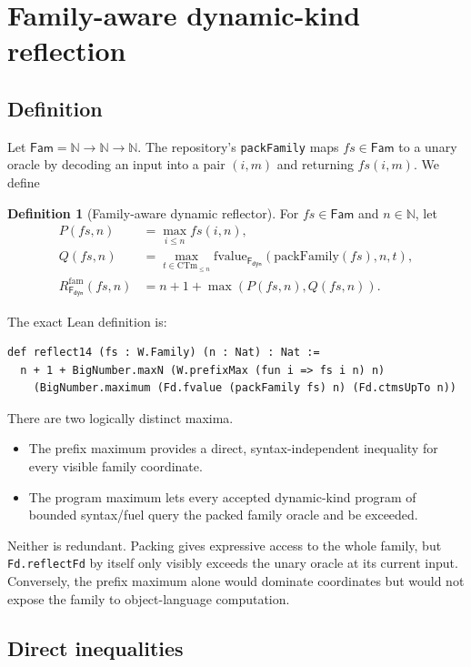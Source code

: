 \documentclass[11pt]{article}
\theoremstyle{definition}
\newtheorem{definition}[theorem]{Definition}
\theoremstyle{remark}
\newcommand{\N}{\mathbb{N}}
\newcommand{\lean}[1]{\texttt{#1}}
\newcommand{\Fam}{\mathsf{Fam}}
\newcommand{\Fd}{\mathsf{F}_{\mathsf{dyn}}}
\newcommand{\Rfam}{R_{\Fd}^{\mathrm{fam}}}
\begin{document}
\section{Family-aware dynamic-kind reflection}

\subsection{Definition}

Let \(\Fam=\N\to\N\to\N\).  The repository's \lean{packFamily} maps
$fs\in\Fam$ to a unary oracle by decoding an input into a pair $(i,m)$ and
returning $fs(i,m)$.  We define

\begin{definition}[Family-aware dynamic reflector]
For $fs\in\Fam$ and $n\in\N$, let
\begin{align*}
P(fs,n)&=\max_{i\le n}fs(i,n),\\
Q(fs,n)&=\max_{t\in\mathrm{CTm}_{\le n}}
  \mathrm{fvalue}_{\Fd}(\mathrm{packFamily}(fs),n,t),\\
\Rfam(fs,n)&=n+1+\max(P(fs,n),Q(fs,n)).
\end{align*}
\end{definition}

The exact Lean definition is:

\begin{lstlisting}
def reflect14 (fs : W.Family) (n : Nat) : Nat :=
  n + 1 + BigNumber.maxN (W.prefixMax (fun i => fs i n) n)
    (BigNumber.maximum (Fd.fvalue (packFamily fs) n) (Fd.ctmsUpTo n))
\end{lstlisting}

There are two logically distinct maxima.

\begin{itemize}[leftmargin=*]
\item The prefix maximum provides a direct, syntax-independent inequality for
  every visible family coordinate.
\item The program maximum lets every accepted dynamic-kind program of bounded
  syntax/fuel query the packed family oracle and be exceeded.
\end{itemize}

Neither is redundant.  Packing gives expressive access to the whole family,
but \lean{Fd.reflectFd} by itself only visibly exceeds the unary oracle at its
current input.  Conversely, the prefix maximum alone would dominate coordinates
but would not expose the family to object-language computation.

\subsection{Direct inequalities}
\end{document}
